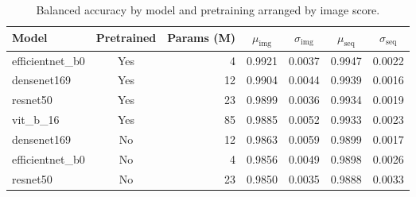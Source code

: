 \begin{table}[H]
\caption{Balanced accuracy by model and pretraining arranged by image score.}
\label{tab:bal_acc_by_model}
\begin{tabular}{l c r c c c c}
\toprule
Model & Pretrained & Params (M) & $\mu_{\mathrm{img}}$ & $\sigma_{\mathrm{img}}$ & $\mu_{\mathrm{seq}}$ & $\sigma_{\mathrm{seq}}$ \\
\midrule
efficientnet\_b0 & Yes & 4 & 0.9921 & 0.0037 & 0.9947 & 0.0022 \\
densenet169 & Yes & 12 & 0.9904 & 0.0044 & 0.9939 & 0.0016 \\
resnet50 & Yes & 23 & 0.9899 & 0.0036 & 0.9934 & 0.0019 \\
vit\_b\_16 & Yes & 85 & 0.9885 & 0.0052 & 0.9933 & 0.0023 \\
densenet169 & No & 12 & 0.9863 & 0.0059 & 0.9899 & 0.0017 \\
efficientnet\_b0 & No & 4 & 0.9856 & 0.0049 & 0.9898 & 0.0026 \\
resnet50 & No & 23 & 0.9850 & 0.0035 & 0.9888 & 0.0033 \\
\bottomrule
\end{tabular}
\end{table}
